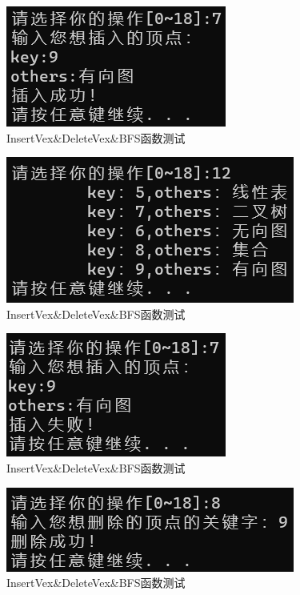 \documentclass[supercite]{Experimental_Report}
\theoremstyle{definition}
\begin{document}
\begin{enumerate}
	
	\begin{figure}[H] %
		\begin{center}
			\includegraphics[width=0.5\linewidth]{images/graph/7-1.png}
			\caption{InsertVex\&DeleteVex\&BFS函数测试}
			\label{fig2-7-1}
		\end{center}
	\end{figure}
	
	\begin{figure}[H] %
		\begin{center}
			\includegraphics[width=0.5\linewidth]{images/graph/7-1-12.png}
			\caption{InsertVex\&DeleteVex\&BFS函数测试}
			\label{fig2-7-2}
		\end{center}
	\end{figure}
	\begin{figure}[H] %
		\begin{center}
			\includegraphics[width=0.5\linewidth]{images/graph/7-2.png}
			\caption{InsertVex\&DeleteVex\&BFS函数测试}
			\label{fig2-7-3}
		\end{center}
	\end{figure}
	\begin{figure}[H] %
		\begin{center}
			\includegraphics[width=0.5\linewidth]{images/graph/8-1.png}
			\caption{InsertVex\&DeleteVex\&BFS函数测试}
			\label{fig2-7-4}
		\end{center}
	\end{figure}
	

\end{enumerate}
\end{document}
